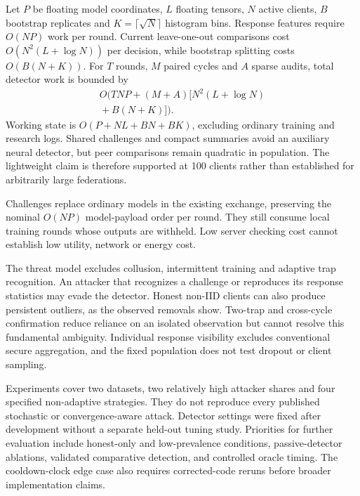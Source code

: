 \documentclass[conference]{IEEEtran}
\makeatletter
\renewcommand{\section}{\@startsection{section}{1}{\z@}{1.5ex}{0.7ex}{\normalfont\normalsize\centering\scshape}}
\makeatother
\begin{document}
\section{Complexity and Limitations}
Let $P$ be floating model coordinates, $L$ floating tensors, $N$ active
clients, $B$ bootstrap replicates and $K=\lceil\sqrt N\rceil$ histogram
bins. Response features require $O(NP)$ work per round. Current
leave-one-out comparisons cost $O(N^2(L+\log N))$ per decision, while
bootstrap splitting costs $O(B(N+K))$. For $T$ rounds, $M$ paired cycles
and $A$ sparse audits, total detector work is bounded by
\begin{equation}
\begin{split}
O\bigl(TNP+(M+A)\bigl[N^2(L+\log N)\\
{}+B(N+K)\bigr]\bigr).
\end{split}
\end{equation}
Working state is $O(P+NL+BN+BK)$, excluding ordinary training and
research logs. Shared challenges and compact summaries avoid an auxiliary
neural detector, but peer comparisons remain quadratic in population.
The lightweight claim is therefore supported at 100 clients rather than
established for arbitrarily large federations.

Challenges replace ordinary models in the existing exchange, preserving
the nominal $O(NP)$ model-payload order per round. They still consume
local training rounds whose outputs are withheld. Low server checking
cost cannot establish low utility, network or energy cost.

The threat model excludes collusion, intermittent training and adaptive
trap recognition. An attacker that recognizes a challenge or reproduces
its response statistics may evade the detector. Honest non-IID clients
can also produce persistent outliers, as the observed removals show.
Two-trap and cross-cycle confirmation reduce reliance on an isolated
observation but cannot resolve this fundamental ambiguity. Individual
response visibility excludes conventional secure aggregation, and the
fixed population does not test dropout or client sampling.

Experiments cover two datasets, two relatively high attacker shares and
four specified non-adaptive strategies. They do not reproduce every
published stochastic or convergence-aware attack. Detector settings were
fixed after development without a separate held-out tuning study.
Priorities for further evaluation include honest-only and low-prevalence
conditions, passive-detector ablations, validated comparative detection,
and controlled oracle timing. The cooldown-clock edge case also requires
corrected-code reruns before broader implementation claims.
\end{document}
